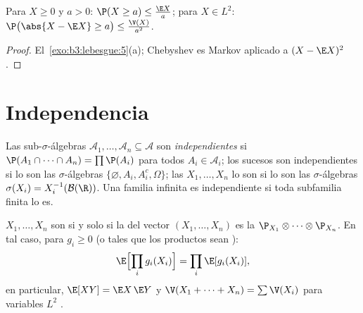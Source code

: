 \begin{proposition}
\label{prop:b3:probability:markov}
Para $X \geq 0$ y $a > 0$: $\P(X \geq a) \leq \frac{\E
X}{a}$; para $X \in L^2$: $\P\bigl(\abs{X - \E X} \geq
a\bigr) \leq \frac{\V(X)}{a^2}$.
\end{proposition}

\begin{proof}
El~\cref{exo:b3:lebesgue:5}(a); Chebyshev es Markov aplicado a
$(X - \E X)^2$.
\end{proof}

\section{Independencia}

\begin{definition}\label{def:b3:probability:independence}
Las sub-$\sigma$-álgebras $\mathcal A_1, \dots, \mathcal A_n
\subseteq \mathcal A$ son \emph{independientes} si
$\P(A_1\cap\dots\cap A_n) = \prod\P(A_i)$ para todos $A_i \in
\mathcal A_i$; los sucesos son independientes si lo son las
$\sigma$-álgebras $\{\varnothing, A_i, A_i^c, \Omega\}$; las
$X_1, \dots, X_n$ lo son si lo son las $\sigma$-álgebras $\sigma(X_i) =
X_i^{-1}(\mathcal B(\R))$. Una familia infinita es independiente si toda
subfamilia finita lo es.
\end{definition}

\begin{theorem}\label{thm:b3:probability:independence}
$X_1, \dots, X_n$ son
 si y solo si la
 del vector $(X_1, \dots, X_n)$ es
la 
$\P_{X_1}\otimes\cdots\otimes\P_{X_n}$. En tal caso, para $g_i \geq 0$
(o tales que los productos sean
):
\[
\E\Bigl[\prod_ig_i(X_i)\Bigr] = \prod_i\E[g_i(X_i)],
\]
en particular, $\E[XY] = \E X\,\E Y$ y $\V(X_1 + \dots +
X_n) = \sum\V(X_i)$ para variables $L^2$
.
\end{theorem}

